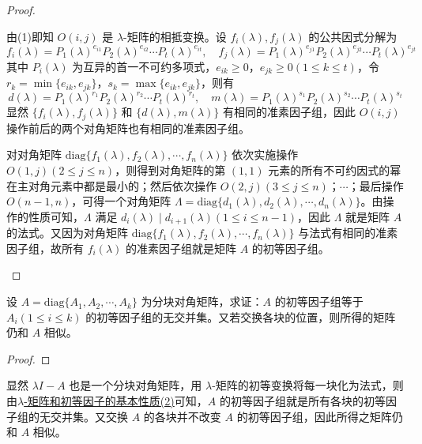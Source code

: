 \documentclass[../../main.tex]{subfiles}
\begin{document}
\begin{proof}
\begin{enumerate}[(1)]
由(1)即知 \(O(i,j)\) 是 \(\lambda\)-矩阵的相抵变换。设 \(f_i(\lambda),f_j(\lambda)\) 的公共因式分解为
\[
f_i(\lambda)=P_1(\lambda)^{e_{i1}}P_2(\lambda)^{e_{i2}}\cdots P_t(\lambda)^{e_{it}}, \quad f_j(\lambda)=P_1(\lambda)^{e_{j1}}P_2(\lambda)^{e_{j2}}\cdots P_t(\lambda)^{e_{jt}}
\]
其中 \(P_i(\lambda)\) 为互异的首一不可约多项式，\(e_{ik}\geqslant 0\)，\(e_{jk}\geqslant 0(1\leqslant  k\leqslant  t)\)，令 \(r_k = \min\{e_{ik},e_{jk}\}\)，\(s_k = \max\{e_{ik},e_{jk}\}\)，则有
\[
d(\lambda)=P_1(\lambda)^{r_1}P_2(\lambda)^{r_2}\cdots P_t(\lambda)^{r_t}, \quad m(\lambda)=P_1(\lambda)^{s_1}P_2(\lambda)^{s_2}\cdots P_t(\lambda)^{s_t}
\]
显然 \(\{f_i(\lambda),f_j(\lambda)\}\) 和 \(\{d(\lambda),m(\lambda)\}\) 有相同的准素因子组，因此 \(O(i,j)\) 操作前后的两个对角矩阵也有相同的准素因子组。

对对角矩阵 \(\mathrm{diag}\{f_1(\lambda),f_2(\lambda),\cdots,f_n(\lambda)\}\) 依次实施操作 \(O(1,j)(2\leqslant  j\leqslant  n)\)，则得到对角矩阵的第 \((1,1)\) 元素的所有不可约因式的幂在主对角元素中都是最小的；然后依次操作 \(O(2,j)(3\leqslant  j\leqslant  n)\)；\(\cdots\)；最后操作 \(O(n - 1,n)\)，可得一个对角矩阵 \(\varLambda=\mathrm{diag}\{d_1(\lambda),d_2(\lambda),\cdots,d_n(\lambda)\}\)。由操作的性质可知，\(\varLambda\) 满足 \(d_i(\lambda)\mid d_{i + 1}(\lambda)(1\leqslant  i\leqslant  n - 1)\)，因此 \(\varLambda\) 就是矩阵 \(A\) 的法式。又因为对角矩阵 \(\mathrm{diag}\{f_1(\lambda),f_2(\lambda),\cdots,f_n(\lambda)\}\) 与法式有相同的准素因子组，故所有 \(f_i(\lambda)\) 的准素因子组就是矩阵 \(A\) 的初等因子组。
\end{enumerate}
\end{proof}

\begin{proposition}
设 \(A = \mathrm{diag}\{A_1,A_2,\cdots,A_k\}\) 为分块对角矩阵，求证：\(A\) 的初等因子组等于 \(A_i(1\leqslant  i\leqslant  k)\) 的初等因子组的无交并集。又若交换各块的位置，则所得的矩阵仍和 \(A\) 相似。
\end{proposition}
\begin{proof}
\end{proof}
显然 \(\lambda I - A\) 也是一个分块对角矩阵，用 \(\lambda\)-矩阵的初等变换将每一块化为法式，则由\hyperref[theorem:lambda-矩阵和初等因子的基本性质]{$\lambda$-矩阵和初等因子的基本性质(2)}可知，\(A\) 的初等因子组就是所有各块的初等因子组的无交并集。又交换 \(A\) 的各块并不改变 \(A\) 的初等因子组，因此所得之矩阵仍和 \(A\) 相似。
\end{document}
